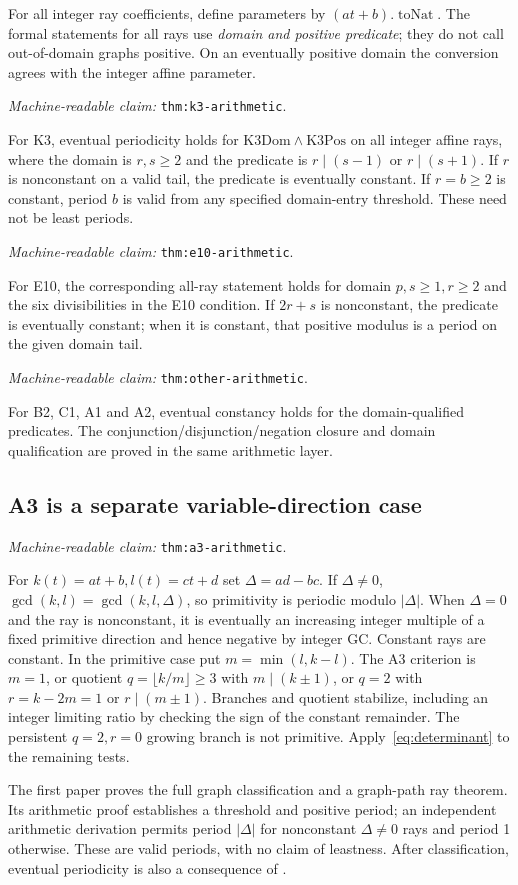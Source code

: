 \documentclass[11pt]{amsart}
\newcommand{\record}[1]{\nolinkurl{#1}}
\newcommand{\claimid}[1]{\par\nopagebreak\noindent\textit{Machine-readable claim:} \record{#1}.\par}
\theoremstyle{definition}\newtheorem{definition}{Definition}
\begin{document}
For all integer ray coefficients, define parameters by
$(at+b).\operatorname{toNat}$. The formal statements for all rays use
\emph{domain and positive predicate}; they do not call out-of-domain
graphs positive. On an eventually positive domain the conversion
agrees with the integer affine parameter.
\label{thm:k3-arithmetic}\claimid{thm:k3-arithmetic}
For K3, eventual periodicity holds for
$\mathrm{K3Dom}\wedge\mathrm{K3Pos}$ on all integer affine rays,
where the domain is $r,s\ge2$ and the predicate is
$r\mid(s-1)$ or $r\mid(s+1)$. If $r$ is nonconstant on a valid tail,
the predicate is eventually constant. If $r=b\ge2$ is
constant, period $b$ is valid from any specified
domain-entry threshold. These need not be least periods.
\label{thm:e10-arithmetic}\claimid{thm:e10-arithmetic}
For E10, the corresponding all-ray statement holds
for domain $p,s\ge1,r\ge2$ and the six divisibilities in the E10
condition. If $2r+s$ is nonconstant, the predicate is eventually
constant; when it is constant, that
positive modulus is a period on the given domain tail.
\label{thm:other-arithmetic}\claimid{thm:other-arithmetic}
For B2, C1, A1 and A2, eventual constancy holds for the domain-qualified
predicates. The conjunction/disjunction/negation closure and domain
qualification are proved in the same arithmetic layer.

\subsection{A3 is a separate variable-direction case}\label{thm:a3-arithmetic}
\claimid{thm:a3-arithmetic}
For $k(t)=at+b,l(t)=ct+d$ set $\Delta=ad-bc$. If $\Delta\ne0$,
$\gcd(k,l)=\gcd(k,l,\Delta)$, so primitivity is periodic modulo
$|\Delta|$. When $\Delta=0$ and the ray is nonconstant, it is
eventually an increasing integer multiple of a fixed primitive
direction and hence negative by integer GC. Constant rays are constant.
In the primitive case put $m=\min(l,k-l)$. The A3 criterion is
$m=1$, or quotient $q=\lfloor k/m\rfloor\ge3$ with $m\mid(k\pm1)$,
or $q=2$ with $r=k-2m=1$ or $r\mid(m\pm1)$. Branches and quotient
stabilize, including an integer limiting ratio by checking the sign
of the constant remainder. The persistent $q=2,r=0$ growing branch
is not primitive. Apply~\eqref{eq:determinant} to the remaining tests.

The first paper proves the full graph classification and a graph-path
ray theorem. Its arithmetic proof establishes a threshold and positive
period; an independent arithmetic derivation permits period $|\Delta|$
for nonconstant $\Delta\ne0$ rays and period 1 otherwise. These are
valid periods, with no claim of leastness. After classification,
eventual periodicity is also a consequence of
\cite[Theorem 1.15]{BGW}.
\end{document}
